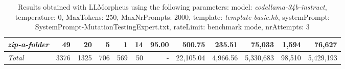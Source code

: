 \begin{table*}
{\begin{tabular}{l||r|r|r|r|r|r||r|r||r|r|r}
   \hline
   \textit{zip-a-folder} & 49 & 20 & 5 & 1 & 14 & 95.00 & 500.75 & 235.51 & 75,033 & 1,594 & 76,627 \\ 
   \hline
   \textit{Total} & 3376 & 1325 & 706 & 569 & 50 & - & 22,105.04  & 4,966.56 & 5,330,683 & 98,510 & 5,429,193 \\ 
 \end{tabular}
 }
 \caption{Results obtained with LLMorpheus using the following parameters: 
   model: \textit{codellama-34b-instruct}, 
   temperature: 0, 
   MaxTokens: 250, 
   MaxNrPrompts: 2000, 
   template: \textit{template-basic.hb}, 
   systemPrompt: SystemPrompt-MutationTestingExpert.txt, 
   rateLimit: benchmark mode, 
   nrAttempts: 3  
 }
\end{table*}

